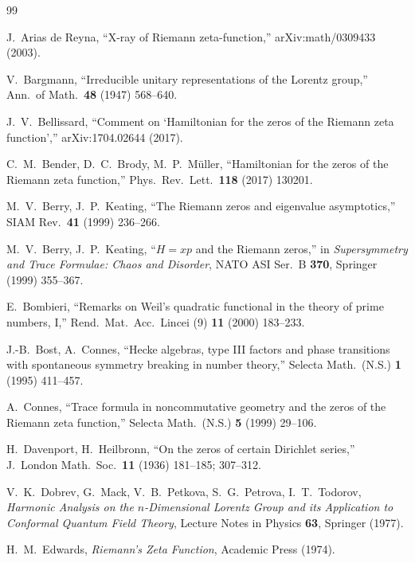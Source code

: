 \documentclass[11pt,a4paper]{article}
\theoremstyle{plain}
\theoremstyle{definition}
\theoremstyle{remark}
\begin{document}
\begin{thebibliography}{99}\small

 J.~Arias de Reyna, ``X-ray of Riemann zeta-function,''
arXiv:math/0309433 (2003).

 V.~Bargmann, ``Irreducible unitary representations of the
Lorentz group,'' Ann.\ of Math.\ \textbf{48} (1947) 568--640.

 J.~V.~Bellissard, ``Comment on `Hamiltonian for the zeros
of the Riemann zeta function','' arXiv:1704.02644 (2017).

 C.~M.~Bender, D.~C.~Brody, M.~P.~M\"uller, ``Hamiltonian for the
zeros of the Riemann zeta function,'' Phys.\ Rev.\ Lett.\ \textbf{118} (2017) 130201.

 M.~V.~Berry, J.~P.~Keating, ``The Riemann zeros and
eigenvalue asymptotics,'' SIAM Rev.\ \textbf{41} (1999) 236--266.

 M.~V.~Berry, J.~P.~Keating, ``$H=xp$ and the Riemann
zeros,'' in \emph{Supersymmetry and Trace Formulae: Chaos and Disorder},
NATO ASI Ser.\ B \textbf{370}, Springer (1999) 355--367.

 E.~Bombieri, ``Remarks on Weil's quadratic functional in the
theory of prime numbers, I,'' Rend.\ Mat.\ Acc.\ Lincei (9) \textbf{11} (2000) 183--233.

 J.-B.~Bost, A.~Connes, ``Hecke algebras, type III factors
and phase transitions with spontaneous symmetry breaking in number theory,''
Selecta Math.\ (N.S.) \textbf{1} (1995) 411--457.

 A.~Connes, ``Trace formula in noncommutative geometry and the
zeros of the Riemann zeta function,'' Selecta Math.\ (N.S.) \textbf{5} (1999) 29--106.

 H.~Davenport, H.~Heilbronn, ``On the zeros of
certain Dirichlet series,'' J.\ London Math.\ Soc.\ \textbf{11} (1936) 181--185; 307--312.

 V.~K.~Dobrev, G.~Mack, V.~B.~Petkova, S.~G.~Petrova,
I.~T.~Todorov, \emph{Harmonic Analysis on the $n$-Dimensional Lorentz Group and
its Application to Conformal Quantum Field Theory}, Lecture Notes in Physics
\textbf{63}, Springer (1977).

 H.~M.~Edwards, \emph{Riemann's Zeta Function}, Academic Press (1974).


\end{thebibliography}
\end{document}
